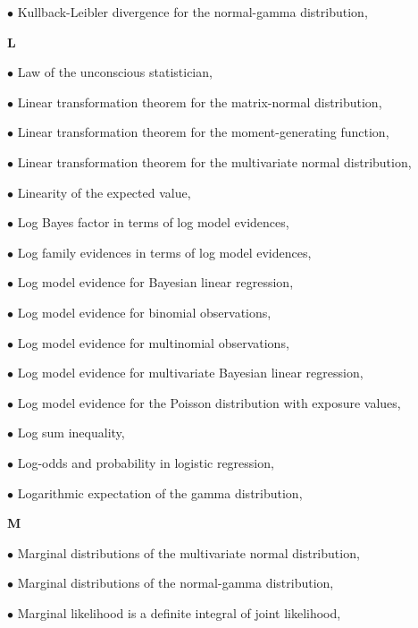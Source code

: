 \documentclass[a4paper,12pt,twoside]{book}
\begin{document}
$\bullet$ Kullback-Leibler divergence for the normal-gamma distribution, \pageref{sec:ng-kl}


\vspace{1em}
\textbf{L}

$\bullet$ Law of the unconscious statistician, \pageref{sec:mean-lotus}

$\bullet$ Linear transformation theorem for the matrix-normal distribution, \pageref{sec:matn-ltt}

$\bullet$ Linear transformation theorem for the moment-generating function, \pageref{sec:mgf-ltt}

$\bullet$ Linear transformation theorem for the multivariate normal distribution, \pageref{sec:mvn-ltt}

$\bullet$ Linearity of the expected value, \pageref{sec:mean-lin}

$\bullet$ Log Bayes factor in terms of log model evidences, \pageref{sec:lbf-lme}

$\bullet$ Log family evidences in terms of log model evidences, \pageref{sec:lfe-lme}

$\bullet$ Log model evidence for Bayesian linear regression, \pageref{sec:blr-lme}

$\bullet$ Log model evidence for binomial observations, \pageref{sec:bin-lme}

$\bullet$ Log model evidence for multinomial observations, \pageref{sec:mult-lme}

$\bullet$ Log model evidence for multivariate Bayesian linear regression, \pageref{sec:mblr-lme}

$\bullet$ Log model evidence for the Poisson distribution with exposure values, \pageref{sec:poissexp-lme}

$\bullet$ Log sum inequality, \pageref{sec:logsum-ineq}

$\bullet$ Log-odds and probability in logistic regression, \pageref{sec:logreg-lonp}

$\bullet$ Logarithmic expectation of the gamma distribution, \pageref{sec:gam-logmean}


\vspace{1em}
\textbf{M}

$\bullet$ Marginal distributions of the multivariate normal distribution, \pageref{sec:mvn-marg}

$\bullet$ Marginal distributions of the normal-gamma distribution, \pageref{sec:ng-marg}

$\bullet$ Marginal likelihood is a definite integral of joint likelihood, \pageref{sec:ml-jl}
\end{document}
